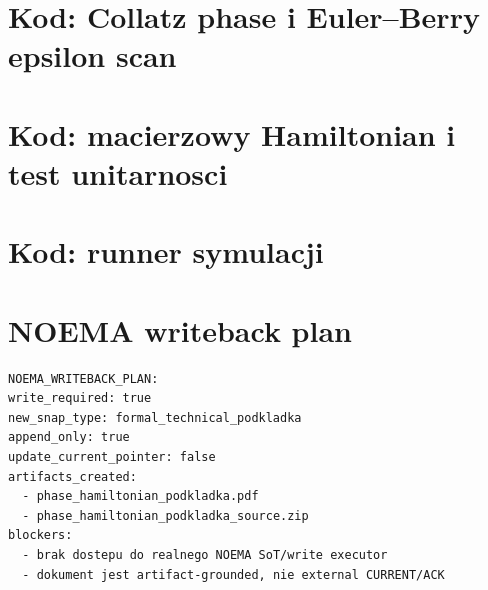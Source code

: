 \documentclass[11pt,a4paper]{article}
\begin{document}
\appendix
\clearpage
\section{Kod: Collatz phase i Euler--Berry epsilon scan}



\clearpage
\section{Kod: macierzowy Hamiltonian i test unitarnosci}



\clearpage
\section{Kod: runner symulacji}



\clearpage
\section*{NOEMA writeback plan}

\begin{verbatim}
NOEMA_WRITEBACK_PLAN:
write_required: true
new_snap_type: formal_technical_podkladka
append_only: true
update_current_pointer: false
artifacts_created:
  - phase_hamiltonian_podkladka.pdf
  - phase_hamiltonian_podkladka_source.zip
blockers:
  - brak dostepu do realnego NOEMA SoT/write executor
  - dokument jest artifact-grounded, nie external CURRENT/ACK
\end{verbatim}
\end{document}
